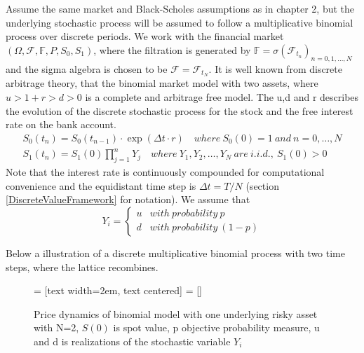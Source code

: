 Assume the same market and Black-Scholes assumptions as in chapter 2, but the underlying stochastic process will be assumed to follow a multiplicative binomial process over discrete periods. We work with the financial market $(\Omega, \mathcal{F}, \mathbb{F}, P, S_0, S_1)$, where the filtration is generated by $\mathbb{F}= \sigma(\mathcal{F}_{t_n})_{n=0,1,\ldots, N}$ and the sigma algebra is chosen to be $\mathcal{F}=\mathcal{F}_{t_{N}}$. It is well known from discrete arbitrage theory, that the binomial market model with two assets, where $u>1+r>d>0$ is a complete and arbitrage free model. The u,d and r describes the evolution of the discrete stochastic process for the stock and the free interest rate on the bank account. 
\begin{align*}
S_{0}(t_n)=S_{0}(t_{n-1}) \cdot \exp(\Delta t \cdot r) \quad where \ S_{0}(0)=1 \ and \ n=0, \ldots, N\\
S_{1}(t_n)=S_{1}(0)\prod_{j=1}^{n} Y_{j} \quad where \ Y_1,Y_2, \ldots, Y_N \ are \ i.i.d., \ S_1(0)>0
\end{align*}
Note that the interest rate is continuously compounded for computational convenience and the equidistant time step is $\Delta t=T/N$ (section \ref{DiscreteValueFramework} for notation). We assume that \[ Y_i = \begin{cases} 
      u & with \ probability \ p \\
      d & with \ probability \ (1-p)
   \end{cases}
\]

Below a illustration of a discrete multiplicative binomial process with two time steps, where the lattice recombines.

\begin{figure}[H]
\centering
 = [text width=2em, text centered]
 = []
\decoRule
\caption[Two Dimensional Binomial Lattice]{Price dynamics of binomial model with one underlying risky asset with N=2, $S(0)$ is spot value, p objective probability measure, u and d is realizations of the stochastic variable $Y_i$}
\label{fig:twoDimLattice}
\end{figure}

